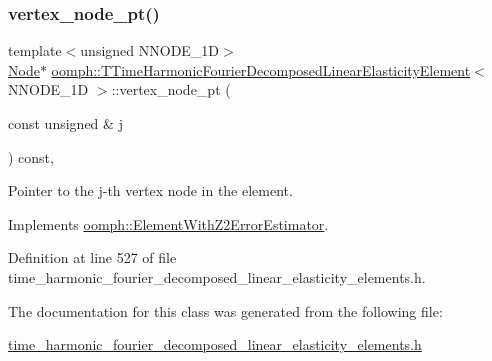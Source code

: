 \subsubsection{\texorpdfstring{vertex\+\_\+node\+\_\+pt()}{vertex\_node\_pt()}}
{\footnotesize\ttfamily template$<$unsigned N\+N\+O\+D\+E\+\_\+1D$>$ \\
\hyperlink{classoomph_1_1Node}{Node}$\ast$ \hyperlink{classoomph_1_1TTimeHarmonicFourierDecomposedLinearElasticityElement}{oomph\+::\+T\+Time\+Harmonic\+Fourier\+Decomposed\+Linear\+Elasticity\+Element}$<$ N\+N\+O\+D\+E\+\_\+1D $>$\+::vertex\+\_\+node\+\_\+pt (\begin{DoxyParamCaption}\item[{const unsigned \&}]{j }\end{DoxyParamCaption}) const\hspace{0.3cm}{\ttfamily [inline]}, {\ttfamily [virtual]}}



Pointer to the j-\/th vertex node in the element. 



Implements \hyperlink{classoomph_1_1ElementWithZ2ErrorEstimator_a0eedccc33519f852c5dc2055ddf2774b}{oomph\+::\+Element\+With\+Z2\+Error\+Estimator}.



Definition at line 527 of file time\+\_\+harmonic\+\_\+fourier\+\_\+decomposed\+\_\+linear\+\_\+elasticity\+\_\+elements.\+h.



The documentation for this class was generated from the following file\+:\begin{DoxyCompactItemize}
\item 
\hyperlink{time__harmonic__fourier__decomposed__linear__elasticity__elements_8h}{time\+\_\+harmonic\+\_\+fourier\+\_\+decomposed\+\_\+linear\+\_\+elasticity\+\_\+elements.\+h}\end{DoxyCompactItemize}
